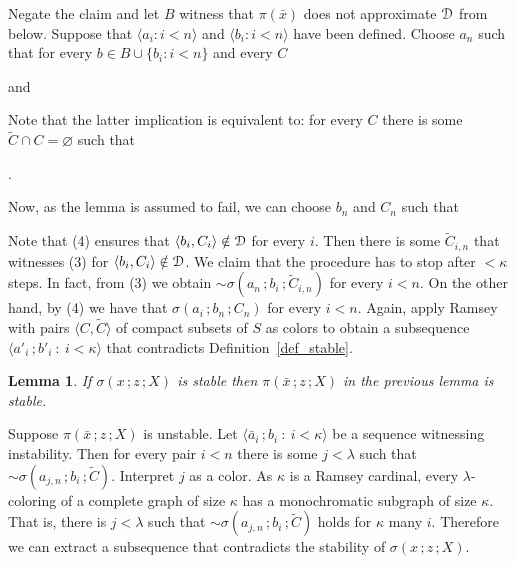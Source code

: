 \documentclass{amsproc}
\makeatletter
\newcounter{thm}
\theoremstyle{mio}
\newtheorem{lemma}[thm]{Lemma}\tcolorboxenvironment{lemma}{mythm}
\providecommand{\proofNameStyle}{\bfseries}
\renewenvironment{proof}[1][\proofname]{\par
  \pushQED{\qed}%
  \normalfont%
  \trivlist
  \item[\hskip\labelsep
        \proofNameStyle
    #1\@addpunct{.}]\ignorespaces
}{%
  \popQED\endtrivlist\@endpefalse
}
\makeatother
\begin{document}
\begin{proof}
  Negate the claim and let $B$ witness that $\pi(\bar x)$ does not approximate ${\EuScript D}$ from below.
  Suppose that $\langle a_i:i<n\rangle$ and $\langle b_i:i<n\rangle$ have been defined.
  Choose $a_n$ such that for every $b\in B\cup\{b_i:i<n\}$ and every $C$

  \quad and

  
  Note that the latter implication is equivalent to: for every $C$ there is some  $\tilde C\cap C=\varnothing$ such that 
  
  .%

  Now, as the lemma is assumed to fail, we can choose $b_n$ and $C_n$ such that


  Note that (4) ensures that $\langle b_i,C_i\rangle\notin{\EuScript D}$ for every $i$.
  Then there is some $\tilde C_{i,n}$ that witnesses (3) for $\langle b_i,C_i\rangle\notin{\EuScript D}$.
  We claim that the procedure has to stop after $<\kappa$ steps.
  In fact, from (3) we obtain ${\sim}\sigma(a_n\,;b_i\,;\tilde C_{i,n})$ for every $i<n$.
  On the other hand, by (4) we have that $\sigma(a_i\,;b_n\,;C_n)$ for every $i<n$.
  Again, apply Ramsey with pairs $\langle C,\tilde C\rangle$ of compact subsets of $S$ as colors to obtain a subsequence $\langle a'_i\,;b'_i\ :\ i<\kappa\rangle$ that contradicts Definition~\ref{def_stable}.
\end{proof}

\begin{lemma}\label{lem_sigma_stable}
  If $\sigma(x\,;z\,;X)$ is stable then $\pi(\bar x\,;z\,;X)$ in the previous lemma is stable.
\end{lemma}

\begin{proof}
  Suppose $\pi(\bar x\,;z\,;X)$ is unstable.
  Let $\langle \bar a_i\,;b_i\ :\ i<\kappa\rangle$ be a sequence witnessing instability.
  Then for every pair $i<n$ there is some $j<\lambda$ such that ${\sim}\sigma(a_{j,n}\,;b_i\,;\tilde C)$.
  Interpret $j$ as a color. 
  As $\kappa$ is a Ramsey cardinal, every $\lambda$-coloring of a complete graph of size $\kappa$ has a monochromatic subgraph of size $\kappa$.
  That is, there is $j<\lambda$ such that ${\sim}\sigma(a_{j,n}\,;b_i\,;\tilde C)$ holds for $\kappa$ many $i$.
  Therefore we can extract a subsequence that contradicts the stability of $\sigma(x\,;z\,;X)$.
\end{proof}
\end{document}
